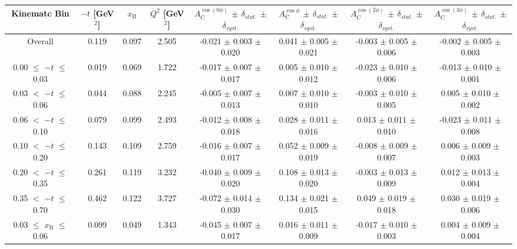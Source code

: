 \begin{table}[width=15cm]
 \begin{center}
\resizebox{16cm}{!} {
  \begin{tabular}{|c|c|c|c|c|c|c|c|}
\hline
Kinematc Bin &  $-t$ [GeV$^{2}$] & $x_{\textrm{B}}$ & $Q^{2}$ [GeV$^{2}$] & 
$A_{\textrm{C}}^{\cos(0\phi)}$ $\pm$ $\delta_{stat.}$ $\pm$ $\delta_{syst.}$ & $A_{\textrm{C}}^{\cos\phi}$ $\pm$ $\delta_{stat.}$ $\pm$ $\delta_{syst.}$
& $A_{\textrm{C}}^{\cos(2\phi)}$ $\pm$ $\delta_{stat.}$ $\pm$ $\delta_{syst.}$ & $A_{\textrm{C}}^{\cos(3\phi)}$ $\pm$ $\delta_{stat.}$ $\pm$ $\delta_{syst.}$ \\
\hline
\hline
Overall &  0.119 & 0.097 &  2.505 &  -0.021 $\pm$  0.003 $\pm$  0.020 & 
0.041  $\pm$  0.005 $\pm$   0.021 &  -0.003  $\pm$  0.005  $\pm$   0.006 &  -0.002  $\pm$   0.005   $\pm$   0.003 \\
\hline
0.00 $\leqslant$ $-t$ $\leqslant$ 0.03 &  0.019 & 0.069 & 1.722  &  -0.017  $\pm$  0.007 $\pm$ 0.017 & 
0.005  $\pm$  0.010  $\pm$   0.012 &  -0.023  $\pm$  0.010 $\pm$  0.006 &  -0.013   $\pm$  0.010   $\pm$   0.001\\
0.03 $<$ $-t$ $\leqslant$ 0.06 &  0.044 & 0.088 & 2.245 & -0.005  $\pm$  0.007  $\pm$   0.013 &
0.007 $\pm$  0.010  $\pm$   0.010 &  -0.003  $\pm$  0.010  $\pm$  0.005 &  0.005   $\pm$  0.010   $\pm$   0.002\\
0.06 $<$ $-t$ $\leqslant$ 0.10 & 0.079  & 0.099 &  2.493 & -0.012  $\pm$  0.008  $\pm$  0.018 & 
0.028 $\pm$  0.011  $\pm$   0.016 & 0.013  $\pm$  0.011 $\pm$   0.010 &  -0.023   $\pm$  0.011  $\pm$    0.008\\
0.10 $<$ $-t$ $\leqslant$ 0.20 & 0.143  & 0.109 &  2.759 &  -0.016  $\pm$  0.007   $\pm$  0.017 & 
0.052 $\pm$  0.009  $\pm$   0.019 &  -0.008  $\pm$  0.009  $\pm$  0.007 & 0.006   $\pm$  0.009    $\pm$  0.003\\
0.20 $<$ $-t$ $\leqslant$ 0.35 &   0.261 & 0.119 &  3.232 &  -0.040 $\pm$   0.009  $\pm$  0.020 &
0.108 $\pm$  0.013  $\pm$ 0.020 & -0.003 $\pm$   0.013  $\pm$  0.009 & 0.012  $\pm$   0.013   $\pm$   0.004\\
0.35 $<$ $-t$ $\leqslant$ 0.70 &  0.462 & 0.122 &  3.727 &  -0.072  $\pm$  0.014  $\pm$   0.030 & 
0.134 $\pm$  0.021  $\pm$   0.015 & 0.049 $\pm$   0.019  $\pm$  0.018 & 0.030   $\pm$  0.019   $\pm$ 0.006\\
\hline
0.03 $\leqslant$ $x_{\textrm{B}}$ $\leqslant$ 0.06 &  0.099 &  0.049 &   1.343 &  -0.045  $\pm$  0.007  $\pm$   0.017 & 
0.016  $\pm$  0.011  $\pm$   0.009 & -0.017 $\pm$  0.010 $\pm$  0.003 &  0.004   $\pm$  0.009  $\pm$    0.004\\

\end{tabular}}
\end{center}
\end{table}
